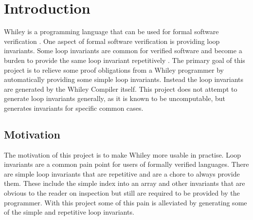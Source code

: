 \chapter{Introduction}\label{C:intro}

Whiley is a programming language that can be used for formal software
verification \cite{whiley-origin}.
One aspect of formal software verification is providing loop
invariants.
Some loop invariants are common for verified software and become a burden to
provide the same loop invariant repetitively \cite{whiley-reflection}\cite{spec-usability}.
The primary goal of this project is to relieve some proof obligations from a
Whiley programmer by automatically providing some simple loop invariants.
Instead the loop invariants are generated by the Whiley Compiler itself.
This project does not attempt to generate loop invariants generally, as it is
known to be uncomputable, but generates invariants for specific common cases.

\section{Motivation}

The motivation of this project is to make Whiley more usable in practise.
Loop invariants are a common pain point for users of formally verified
languages.
There are simple loop invariants that are repetitive and are a chore to
always provide them.
These include the simple index into an array and other invariants that
are obvious to the reader on inspection but still are required to be
provided by the programmer.
With this project some of this pain is alleviated by generating some of the simple
and repetitive loop invariants.

